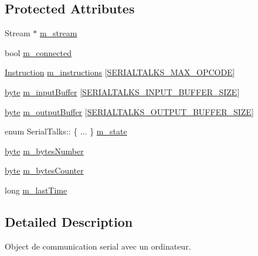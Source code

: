 \subsection*{Protected Attributes}
\begin{DoxyCompactItemize}
\item 
Stream $\ast$ \hyperlink{class_serial_talks_a41747c976eb00f67b6bc97e9deafed18}{m\+\_\+stream}
\item 
bool \hyperlink{class_serial_talks_a456c0512ed2ff0f34e3f389c72d51707}{m\+\_\+connected}
\item 
\hyperlink{class_serial_talks_a35ccf86c63ad45fb719e81b0c8db2f13}{Instruction} \hyperlink{class_serial_talks_a13d8ac072cbe0bd5c6c326f6edaa2d64}{m\+\_\+instructions} \mbox{[}\hyperlink{_serial_talks_8h_a6c244e1c01fe09474f4c7665847e9deb}{S\+E\+R\+I\+A\+L\+T\+A\+L\+K\+S\+\_\+\+M\+A\+X\+\_\+\+O\+P\+C\+O\+DE}\mbox{]}
\item 
\hyperlink{serialutils_8h_a0c8186d9b9b7880309c27230bbb5e69d}{byte} \hyperlink{class_serial_talks_a8a462f95adc02e43325c57aceaa6f16f}{m\+\_\+input\+Buffer} \mbox{[}\hyperlink{_serial_talks_8h_a11d366b3979b2105dcd2a2c7c9329494}{S\+E\+R\+I\+A\+L\+T\+A\+L\+K\+S\+\_\+\+I\+N\+P\+U\+T\+\_\+\+B\+U\+F\+F\+E\+R\+\_\+\+S\+I\+ZE}\mbox{]}
\item 
\hyperlink{serialutils_8h_a0c8186d9b9b7880309c27230bbb5e69d}{byte} \hyperlink{class_serial_talks_a03d177cdcaafce204cf6e39c078e72b8}{m\+\_\+output\+Buffer} \mbox{[}\hyperlink{_serial_talks_8h_aa9b06aaa07f7352b6039e4c16d24c4b2}{S\+E\+R\+I\+A\+L\+T\+A\+L\+K\+S\+\_\+\+O\+U\+T\+P\+U\+T\+\_\+\+B\+U\+F\+F\+E\+R\+\_\+\+S\+I\+ZE}\mbox{]}
\item 
enum Serial\+Talks\+:: \{ ... \}  \hyperlink{class_serial_talks_afcb349051c5b5557bebfc0751bd6c4d1}{m\+\_\+state}
\item 
\hyperlink{serialutils_8h_a0c8186d9b9b7880309c27230bbb5e69d}{byte} \hyperlink{class_serial_talks_a57d258fa613c6d0af8f8e4b1321f45fc}{m\+\_\+bytes\+Number}
\item 
\hyperlink{serialutils_8h_a0c8186d9b9b7880309c27230bbb5e69d}{byte} \hyperlink{class_serial_talks_ab47d58ef0dcabdde5c0d127c0265df6a}{m\+\_\+bytes\+Counter}
\item 
long \hyperlink{class_serial_talks_a8c1f54ff3158f520e09670d66a9ac0ac}{m\+\_\+last\+Time}
\end{DoxyCompactItemize}


\subsection{Detailed Description}
Object de communication serial avec un ordinateur. 

